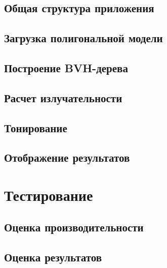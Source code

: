 \documentclass[12pt]{article}
\begin{document}
\subsection{Общая структура приложения}
\subsection{Загрузка полигональной модели}
\subsection{Построение BVH-дерева}
\subsection{Расчет излучательности}
\subsection{Тонирование}
\subsection{Отображение результатов}
\newpage\section{Тестирование}
\subsection{Оценка производительности}
\subsection{Оценка результатов}
\end{document}
